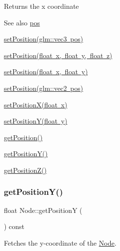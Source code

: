 \begin{DoxyReturn}{Returns}
the x coordinate 
\end{DoxyReturn}
\begin{DoxySeeAlso}{See also}
\mbox{\hyperlink{classsage_1_1Node_a26c32e5ec11e0ed7f33053ecac6830d5}{pos}} 

\mbox{\hyperlink{classsage_1_1Node_a12f5d88d221aa5db70c2bd53f6dc049a}{set\+Position(glm\+::vec3 pos)}} 

\mbox{\hyperlink{classsage_1_1Node_ad9899110e543c6b16997512e47c142c9}{set\+Position(float x, float y, float z)}} 

\mbox{\hyperlink{classsage_1_1Node_aaa8545c103ef1b35e5076dbedab93af5}{set\+Position(float x, float y)}} 

\mbox{\hyperlink{classsage_1_1Node_ae2731cefe38e706c2bf21afae6da18b3}{set\+Position(glm\+::vec2 pos)}} 

\mbox{\hyperlink{classsage_1_1Node_ae1dfc73d6122a95778d5d9db3d1fd913}{set\+Position\+X(float x)}} 

\mbox{\hyperlink{classsage_1_1Node_a5c97d36655f0daa71a5f6c715d2b0470}{set\+Position\+Y(float y)}} 

\mbox{\hyperlink{classsage_1_1Node_a11fbdf2a2dcdf8bdc014df65f3003925}{get\+Position()}} 

\mbox{\hyperlink{classsage_1_1Node_a26337a40b7da400233451b71e85759cc}{get\+Position\+Y()}} 

\mbox{\hyperlink{classsage_1_1Node_a0c6023aabdeeff9cf981ad81e6aaed9c}{get\+Position\+Z()}} 
\end{DoxySeeAlso}
\mbox{\label{classsage_1_1Node_a26337a40b7da400233451b71e85759cc}} 
\subsubsection{\texorpdfstring{getPositionY()}{getPositionY()}}
{\footnotesize\ttfamily float Node\+::get\+PositionY (\begin{DoxyParamCaption}{ }\end{DoxyParamCaption}) const}



Fetches the y-\/coordinate of the \mbox{\hyperlink{classsage_1_1Node}{Node}}. 

